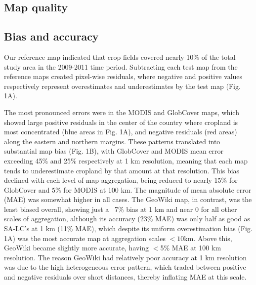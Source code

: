 \documentclass{pnastwo2}
\begin{document}
\begin{article}
\vspace{-0.5 cm}
\section{Map quality}
\subsection{Bias and accuracy}

Our reference map indicated that crop fields covered nearly 10\% of the total study area in the 2009-2011 time period. Subtracting each test map from the reference maps created pixel-wise residuals, where negative and positive values respectively represent overestimates and underestimates by the test map (Fig. 1A).    


The most pronounced errors were in the MODIS and GlobCover maps, which showed large positive residuals in the center of the country where cropland is most concentrated (blue areas in Fig. 1A), and negative residuals (red areas) along the eastern and northern margins.
These patterns translated into substantial map bias (Fig. 1B), with GlobCover and MODIS mean error exceeding 45\% and 25\% respectively at 1 km resolution, meaning that each map tends to underestimate cropland by that amount at that resolution. This bias declined with each level of map aggregation, being reduced to nearly 15\% for GlobCover and 5\% for MODIS at 100 km. The magnitude of mean absolute error (MAE) was somewhat higher in all cases. The GeoWiki map, in contrast, was the least biased overall, showing just a ~7\% bias at 1 km and near 0 for all other scales of aggregation, although its accuracy (23\% MAE) was only half as good as SA-LC's at 1 km (11\% MAE), which despite its uniform overestimation bias (Fig. 1A) was the most accurate map at aggregation scales $<10$km. Above this, GeoWiki became slightly more accurate, having $<$5\% MAE at 100 km resolution. The reason GeoWiki had relatively poor accuracy at 1 km resolution was due to the high heterogeneous error pattern, which traded between positive and negative residuals over short distances, thereby inflating MAE at this scale.  


\end{article}
\end{document}
